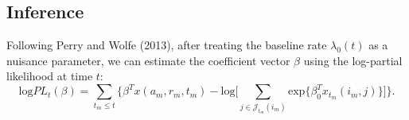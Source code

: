 \documentclass[a4paper]{article}
\begin{document}
\subsection{Inference}
Following Perry and Wolfe (2013), after treating the baseline rate $\lambda_0(t)$ as a nuisance parameter, we can estimate the coefficient vector $\beta$ using the log-partial likelihood at time $t$:
\begin{equation}
\mbox{log}PL_t(\beta)=\sum_{t_m\leq t} \Big\{\beta^Tx(a_m, r_m, t_m)-\mbox{log}\big[\sum_{j\in \mathcal{J}_{t_m}(i_m)} \mbox{exp}\{\beta_0^Tx_{t_m}(i_m, j)\}\big]\Big\}.
\end{equation}

\end{document}

